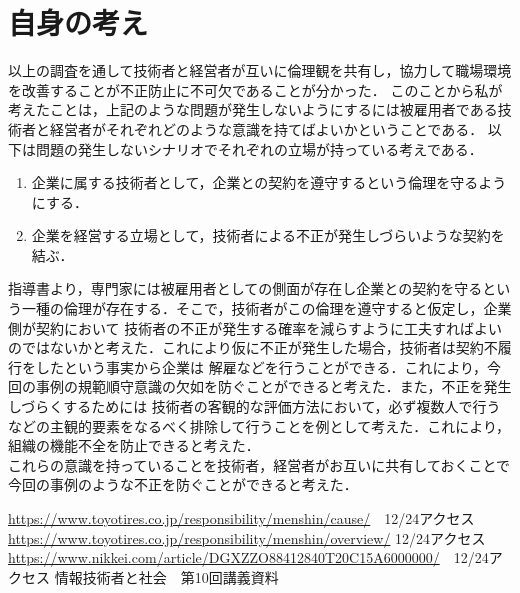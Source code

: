 \documentclass[dvipdfmx]{jarticle}
\begin{document}
\section{自身の考え}
以上の調査を通して技術者と経営者が互いに倫理観を共有し，協力して職場環境を改善することが不正防止に不可欠であることが分かった．
このことから私が考えたことは，上記のような問題が発生しないようにするには被雇用者である技術者と経営者がそれぞれどのような意識を持てばよいかということである．
以下は問題の発生しないシナリオでそれぞれの立場が持っている考えである．
\begin{enumerate}
  \item 企業に属する技術者として，企業との契約を遵守するという倫理を守るようにする．\cite{3}
  \item 企業を経営する立場として，技術者による不正が発生しづらいような契約を結ぶ．
\end{enumerate}
指導書より，専門家には被雇用者としての側面が存在し企業との契約を守るという一種の倫理が存在する．そこで，技術者がこの倫理を遵守すると仮定し，企業側が契約において
技術者の不正が発生する確率を減らすように工夫すればよいのではないかと考えた．これにより仮に不正が発生した場合，技術者は契約不履行をしたという事実から企業は
解雇などを行うことができる．これにより，今回の事例の規範順守意識の欠如を防ぐことができると考えた．また，不正を発生しづらくするためには
技術者の客観的な評価方法において，必ず複数人で行うなどの主観的要素をなるべく排除して行うことを例として考えた．これにより，組織の機能不全を防止できると考えた．\\
これらの意識を持っていることを技術者，経営者がお互いに共有しておくことで今回の事例のような不正を防ぐことができると考えた．
\begin{thebibliography}{99}
   \url{https://www.toyotires.co.jp/responsibility/menshin/cause/}　12/24アクセス
   \url{https://www.toyotires.co.jp/responsibility/menshin/overview/} 12/24アクセス
   \url{https://www.nikkei.com/article/DGXZZO88412840T20C15A6000000/}　12/24アクセス
   情報技術者と社会　第10回講義資料
\end{thebibliography}
\end{document}
